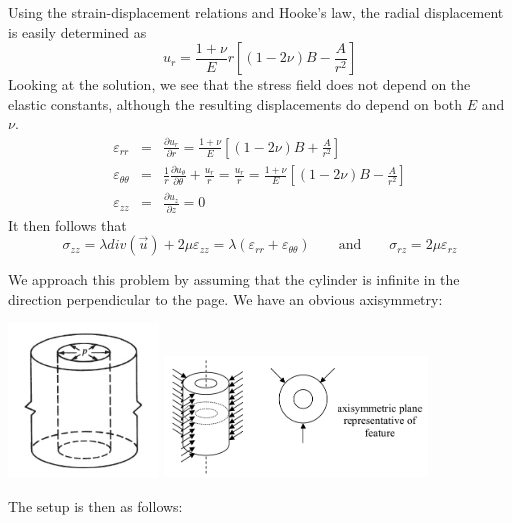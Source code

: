Using the strain-displacement relations and Hooke's law, the radial
displacement is easily determined as
\[
u_r = \frac{1+\nu}{E}r \left[ (1-2\nu) B - \frac{A}{r^2}\right]
\]
Looking at the solution, we see that 
the stress field does not depend on the elastic constants, although the
resulting displacements do depend on both $E$ and $\nu$.
\begin{eqnarray}
\varepsilon_{rr} &=& \frac{\partial u_r}{\partial r} = 
\frac{1+\nu}{E} \left[ (1-2\nu) B + \frac{A}{r^2}\right]
\\
\varepsilon_{\theta\theta} &=& \frac1r \frac{\partial u_\theta}{\partial \theta} + \frac{u_r}{r} 
=\frac{u_r}{r}  
=\frac{1+\nu}{E} \left[ (1-2\nu) B - \frac{A}{r^2}\right] 
\\
\varepsilon_{zz} &=& \frac{\partial u_z}{\partial z} = 0 
\end{eqnarray}
It then follows that 
\[
\sigma_{zz} = \lambda div(\vec{u}) + 2 \mu \varepsilon_{zz} = \lambda (\varepsilon_{rr} + \varepsilon_{\theta\theta})
\qquad
\text{and}
\qquad
\sigma_{rz} = 2 \mu \varepsilon_{rz} 
\]

We approach this problem by assuming that the cylinder is infinite in the direction perpendicular 
to the page. We have an obvious axisymmetry: 

\begin{center}
\includegraphics[width=4cm]{python_codes/fieldstone_90/images/cyl}
\includegraphics[width=7cm]{python_codes/fieldstone_90/images/cyl2}\\
\end{center}

The setup is then as follows:

